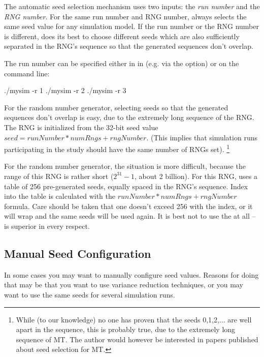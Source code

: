 The automatic seed selection mechanism uses two inputs: the \textit{run number}
 and the \textit{RNG number}. For the same run number and RNG number,
{\opp} always selects the same seed value for any simulation model.
If the run number or the RNG number is different, {\opp} does its best
to choose different seeds which are also sufficiently separated in the RNG's sequence
so that the generated sequences don't overlap.

The run number can be specified either in in  (e.g. via the
 option) or on the command line:

\begin{commandline}
./mysim -r 1
./mysim -r 2
./mysim -r 3
\end{commandline}

For the  random number generator, selecting seeds
so that the generated sequences don't overlap is easy,
due to the extremely long sequence of the RNG.
The RNG is initialized from the 32-bit seed value $seed = runNumber*numRngs + rngNumber$.
(This implies that simulation runs participating in the study should have
the same number of RNGs set).
    \footnote{While (to our knowledge) no one has proven that the seeds 0,1,2,...
    are well apart in the sequence, this is probably true, due to the extremely
    long sequence of MT. The author would however be interested in papers
    published about seed selection for MT.}

For the  random number generator, the situation is more difficult,
because the range of this RNG is rather short ($2^{31}-1$, about 2 billion).
For this RNG, {\opp} uses a table of 256 pre-generated seeds, equally spaced
in the RNG's sequence. Index into the table is calculated with the
$runNumber*numRngs + rngNumber$ formula. Care should be taken that
one doesn't exceed 256 with the index, or it will wrap and the
same seeds will be used again. It is best not to use the 
at all --  is superior in every respect.


\subsection{Manual Seed Configuration}

In some cases you may want to manually configure seed values.
Reasons for doing that may be that you want to use variance reduction
techniques, or you may want to use the same seeds for several simulation
runs.

